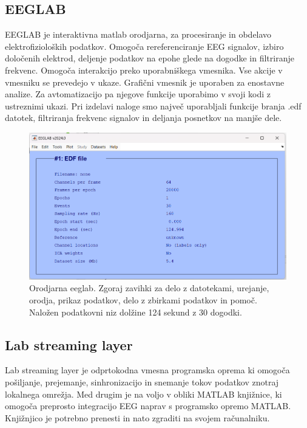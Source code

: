 \subsection{EEGLAB}
EEGLAB je interaktivna matlab orodjarna, za procesiranje in obdelavo elektrofizioloških podatkov. Omogoča rereferenciranje EEG signalov, izbiro določenih elektrod, deljenje podatkov na epohe glede na dogodke in filtriranje frekvenc. Omogoča interakcijo preko uporabniškega vmesnika. Vse akcije v vmesniku se prevedejo v ukaze. Grafični vmesnik je uporaben za enostavne analize. Za avtomatizacijo pa njegove funkcije uporabimo v svoji kodi z ustreznimi ukazi. Pri izdelavi naloge smo največ uporabljali funkcije branja .edf datotek, filtriranja frekvenc signalov in deljanja posnetkov na manjše dele.\cite{EEGLAB}
\begin{figure}[h!]
    \begin{center}
    \includegraphics[width=1\linewidth]{slike/EEGLAB.png}
    \end{center}
    \caption{Orodjarna eeglab. Zgoraj zavihki za delo z datotekami, urejanje, orodja, prikaz podatkov, delo z zbirkami podatkov in pomoč. Naložen podatkovni niz dolžine 124 sekund z 30 dogodki.}
    \end{figure}

\subsection{Lab streaming layer}
Lab streaming layer je odprtokodna vmesna programska oprema ki omogoča pošiljanje, prejemanje, sinhronizacijo in snemanje tokov podatkov znotraj lokalnega omrežja. Med drugim je na voljo v obliki MATLAB knjižnice, ki omogoča preprosto integracijo EEG naprav s programsko opremo MATLAB. Knjižnjico je potrebno prenesti in nato zgraditi na svojem računalniku.  \cite{Lslwebsite}

